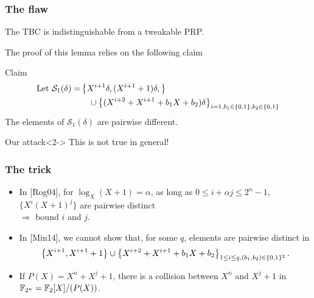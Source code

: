 \documentclass{beamer}
\begin{document}
	\begin{frame}
		\frametitle{The flaw}

		\begin{lemma}[{Lemma 1 of [Min14]}]
			The TBC is indistinguishable from a tweakable PRP.
		\end{lemma}
		The proof of this lemma relies on the following claim
		\begin{block}{Claim}
		\begin{align*}
		\mbox{Let }\mathcal{S}_1(\delta) = & \left\{X^{i+1}\delta, (X^{i+1} +1)\delta,\right\} \\
		 &\ \ \  \cup \left\{ (X^{i+2} + X^{i+1} + b_1 X + b_2)\delta \right\}_{i=1, b_1 \in \{0, 1\}, b_2 \in \{0, 1\}} 
		\end{align*}
		The elements of $\mathcal{S}_1(\delta)$
		are pairwise different.
		\end{block}
	
		\begin{alertblock}{Our attack}<2->
			This is not true in general!
		\end{alertblock}

	\end{frame}

	\begin{frame}
		\frametitle{The trick}

		\begin{itemize}
			\item In [Rog04], for $\log_X (X+1) = \alpha$, as long as $0 \leq i + \alpha j \leq 2^{n}-1$, $\{X^i (X+1)^j\}$ are pairwise distinct 
			\\ \tab $\Rightarrow$ bound $i$ and $j$.
			
			\item<2-> In [Min14], we cannot show that, for some $q$, elements are pairwise distinct in 
				\[
				\left\{X^{i+1}, X^{i+1} +1 \right\} \cup \left\{ X^{i+2} + X^{i+1} + b_1 X + b_2\right\}_{1\leq i \leq q, (b_1,b_2) \in \{0, 1\}^2}.
				\]
		
			\item<3-> If $P(X) = X^n + X^j + 1$, there is a collision between $X^n$ and $X^j + 1$ in $\mathbb{F}_{2^n} = \mathbb{F}_2[X]/(P(X))$.
		\end{itemize}
	\end{frame}
\end{document}
